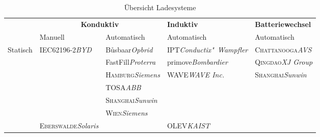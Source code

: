 \begin{table}\centering
	\begin{tabularx}{\linewidth}{lp{2.1cm}p{2.1cm}XX}
		\toprule
		                           &                       \multicolumn{2}{c}{\textbf{Konduktiv}}                       & \textbf{Induktiv}                     & \textbf{Batteriewechsel}                \\
		\cmidrule{2-3}             & Manuell                                   & Automatisch                            & Automatisch                           & Automatisch                             \\ \midrule
		\multirow{12}{*}{Statisch} & IEC62196-2\newline\emph{BYD}              & Bůsbaar\newline\emph{Opbrid}           & IPT\newline\emph{Conductix"~Wampfler} & \textsc{Chattanooga}\newline\emph{AVS}  \\
		                           &                                           & FastFill\newline\emph{Proterra}        & primove\newline\emph{Bombardier}      & \textsc{Qingdao}\newline\emph{XJ Group} \\
		                           &                                           & \textsc{Hamburg}\newline\emph{Siemens} & WAVE\newline\emph{WAVE Inc.}          & \textsc{Shanghai}\newline\emph{Sunwin}  \\
		                           &                                           & TOSA\newline\emph{ABB}                 &                                       &  \\
		                           &                                           & \textsc{Shanghai}\newline\emph{Sunwin} &                                       &  \\
		                           &                                           & \textsc{Wien}\newline\emph{Siemens}    &                                       &  \\ \midrule
		\multirow{2}{*}{Dynamisch} & \textsc{Eberswalde}\newline\emph{Solaris} &                                        & OLEV\newline\emph{KAIST}              &  \\ \bottomrule
	\end{tabularx}
	\caption{Übersicht Ladesysteme}
	\label{uebersichtLadesysteme}
\end{table}

